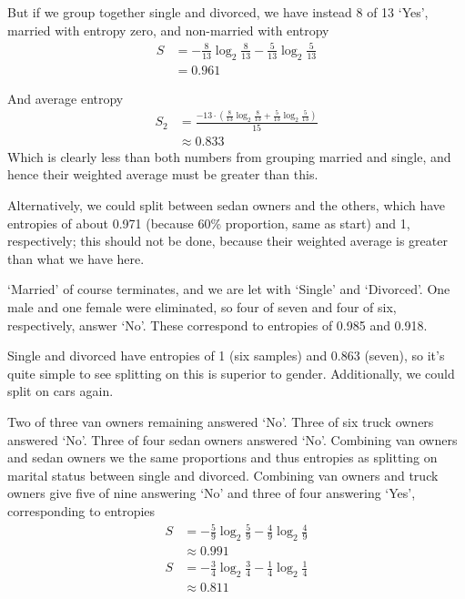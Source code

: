 \documentclass{article}
\begin{document}
	\par
	But if we group together single and divorced, we have instead 8 of 13 `Yes', married with entropy zero, and non-married with entropy
	\begin{align*}
		S &= -\frac{8}{13}\log_2\frac{8}{13}-\frac{5}{13}\log_2\frac{5}{13}\\
		&= 0.961
	\end{align*}
	\par
	And average entropy
	\begin{align*}
		S_2 &= \frac{-13\cdot\left(\frac{8}{13}\log_2\frac{8}{13}+\frac{5}{13}\log_2\frac{5}{13}\right)}{15}\\
		&\approx 0.833
	\end{align*}
	Which is clearly less than both numbers from grouping married and single, and hence their weighted average must be greater than this. 
	\par
	Alternatively, we could split between sedan owners and the others, which have entropies of about 0.971 (because 60\% proportion, same as start) and 1, respectively; this should not be done, because their weighted average is greater than what we have here.
	\par 
	`Married' of course terminates, and we are let with `Single' and `Divorced'. One male and one female were eliminated, so four of seven and four of six, respectively, answer `No'. These correspond to entropies of 0.985 and 0.918.
	\par 
	Single and divorced have entropies of 1 (six samples) and 0.863 (seven), so it's quite simple to see splitting on this is superior to gender. Additionally, we could split on cars again.
	\par 
	Two of three van owners remaining answered `No'. Three of six truck owners answered `No'. Three of four sedan owners answered `No'. Combining van owners and sedan owners we the same proportions and thus entropies as splitting on marital status between single and divorced. Combining van owners and truck owners give five of nine answering `No' and three of four answering `Yes', corresponding to entropies
	\begin{align*}
		S &= -\frac{5}{9}\log_2\frac{5}{9} -\frac{4}{9}\log_2\frac{4}{9}\\
		&\approx 0.991\\
		S &= -\frac{3}{4}\log_2\frac{3}{4} -\frac{1}{4}\log_2\frac{1}{4}\\
		&\approx 0.811\\
	\end{align*}
\end{document}
